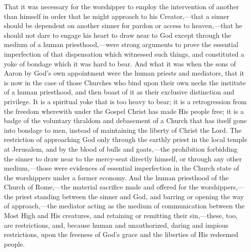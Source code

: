\documentclass[english,]{book}
\begin{document}
That it was necessary for the worshipper to employ the intervention of another than himself in order that he might approach to his Creator,---that a sinner should be dependent on another sinner for pardon or access to heaven,---that he should not dare to engage his heart to draw near to God except through the medium of a human priesthood,---were strong arguments to prove the essential imperfection of that dispensation which witnessed such things, and constituted a yoke of bondage which it was hard to bear. And what it was when the sons of Aaron by God's own appointment were the human priests and mediators, that it is now in the case of those Churches who bind upon their own necks the institute of a human priesthood, and then boast of it as their exclusive distinction and privilege. It is a spiritual yoke that is too heavy to bear; it is a retrogression from the freedom wherewith under the Gospel Christ has made His people free; it is a badge of the voluntary thraldom and debasement of a Church that has itself gone into bondage to men, instead of maintaining the liberty of Christ the Lord. The restriction of approaching God only through the earthly priest in the local temple at Jerusalem, and by the blood of bulls and goats,---the prohibition forbidding the sinner to draw near to the mercy-seat directly himself, or through any other medium,---those were evidences of essential imperfection in the Church state of the worshippers under a former economy. And the human priesthood of the Church of Rome,---the material sacrifice made and offered for the worshippers,---the priest standing between the sinner and God, and barring or opening the way of approach,---the mediator acting as the medium of communication between the Most High and His creatures, and retaining or remitting their sin,---these, too, are restrictions, and, because human and unauthorized, daring and impious restrictions, upon the freeness of God's grace and the liberties of His redeemed people.
\end{document}

